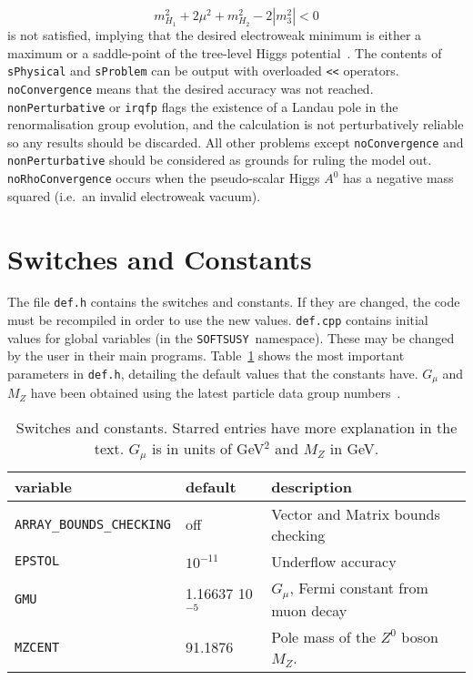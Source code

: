 \documentclass[]{article}
\def\SOFTSUSY{{\tt SOFTSUSY}}
\def\code#1{\small{\tt #1}\normalsize}
\begin{document}
\begin{equation}
m_{H_1}^2 + 2 \mu^2 + m_{H_2}^2 - 2 |m_3^2| <0 \label{higgsufb}
\end{equation}
is not satisfied, implying that the desired electroweak minimum is either a
maximum or a saddle-point of the tree-level Higgs
potential~\cite{Barger:1994gh}. The contents of \code{sPhysical} and
\code{sProblem} can be output with overloaded \code{<<} operators.
\code{noConvergence} means that the desired
accuracy was not reached. \code{nonPerturbative} or \code{irqfp} flags the
existence of a Landau pole in the renormalisation group evolution, and the
calculation is not perturbatively reliable so any results should be discarded.
All other problems except \code{noConvergence} and
\code{nonPerturbative} should be
considered as grounds for ruling the model out.
\code{noRhoConvergence} occurs when the pseudo-scalar Higgs $A^0$ has 
a negative mass squared (i.e.\ an invalid electroweak vacuum).


\section{Switches and Constants \label{sec:switches}}
The file \code{def.h} contains the switches and constants. If they are
changed, the code must be 
recompiled in order to use the new values. \code{def.cpp} contains initial
values for global variables (in the \SOFTSUSY~namespace). These may be changed
by the user in their main programs. 
Table~\ref{tab:switches} shows the
most important parameters in 
\code{def.h}, detailing the default values that the constants have.
$G_\mu$ and $M_Z$ have been obtained using the latest particle
data group numbers~\cite{Groom:2000in}. \vspace{1cm}
\begin{table}\begin{center}
\begin{tabular}{lll}
variable & default & description \\ \hline
\code{ARRAY\_BOUNDS\_CHECKING} & off & Vector and Matrix bounds checking\\
\code{EPSTOL} & $10^{-11}$ & Underflow accuracy\\
\code{GMU} & 1.16637 10$^{-5}$ & $G_\mu$, Fermi constant from muon decay\\
\code{MZCENT} & 91.1876 & Pole mass of the $Z^0$ boson $M_Z$.\\
\end{tabular}\caption{ \label{tab:switches} Switches and constants. Starred entries have more explanation in the text.
$G_\mu$ is in units of GeV$^2$ and $M_Z$ in GeV.} \end{center}\end{table}
\end{document}
